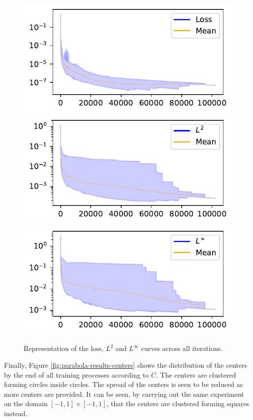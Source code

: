 \documentclass[12pt]{report} %
\begin{document}
\begin{figure}[h]
  \includegraphics[width=.7\textwidth]{imagenes/experiments/2d/statistical_2d_full_scheduler_interpolation/parabola/Loss_curves_semilogy_all.pdf}
  \includegraphics[width=.7\textwidth]{imagenes/experiments/2d/statistical_2d_full_scheduler_interpolation/parabola/L2_curves_semilogy_all.pdf}
  \includegraphics[width=.7\textwidth]{imagenes/experiments/2d/statistical_2d_full_scheduler_interpolation/parabola/Linf_curves_semilogy_all.pdf}
  \caption{Representation of the loss, $L^2$ and $L^\infty$ curves across all iterations.}
  \label{fig:parabola-results-last-iterations}
\end{figure}

Finally,
Figure \ref{fig:parabola-results-centers} shows the distribution of the centers by the end of all training processes according to $C$. The centers are clustered forming circles inside circles. The spread of the centers is seen to be reduced as more centers are provided. It can be seen, by carrying out the same experiment on the domain $[-1,1]\times[-1,1]$, that the centers are clustered forming squares instead.
\end{document}
